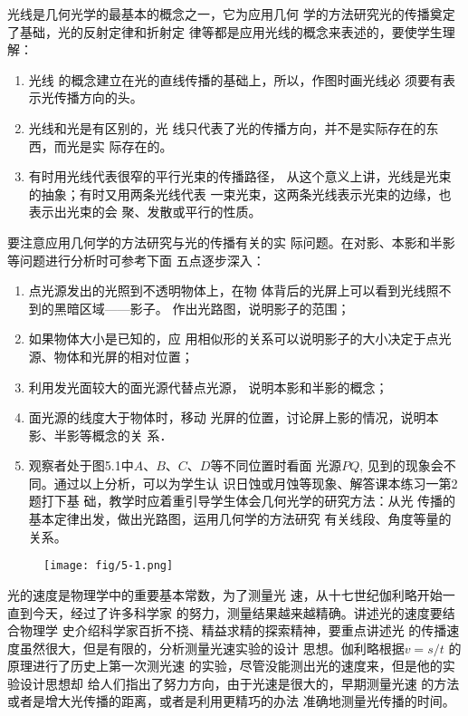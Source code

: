 光线是几何光学的最基本的概念之一，它为应用几何
学的方法研究光的传播奠定了基础，光的反射定律和折射定
律等都是应用光线的概念来表述的，要使学生理解：
\begin{enumerate}
\item 光线
的概念建立在光的直线传播的基础上，所以，作图时画光线必
须要有表示光传播方向的头。    
\item 光线和光是有区别的，光
线只代表了光的传播方向，并不是实际存在的东西，而光是实
际存在的。    
\item 有时用光线代表很窄的平行光束的传播路径，
从这个意义上讲，光线是光束的抽象；有时又用两条光线代表
一束光束，这两条光线表示光束的边缘，也表示出光束的会
聚、发散或平行的性质。
\end{enumerate}

要注意应用几何学的方法研究与光的传播有关的实
际问题。在对影、本影和半影等问题进行分析时可参考下面
五点逐步深入：
\begin{enumerate}

\item 点光源发出的光照到不透明物体上，在物
体背后的光屏上可以看到光线照不到的黑暗区域——影子。
作出光路图，说明影子的范围；
\item 如果物体大小是已知的，应
用相似形的关系可以说明影子的大小决定于点光源、物体和光屏的相对位置；\item 利用发光面较大的面光源代替点光源，
说明本影和半影的概念；
\item 面光源的线度大于物体时，移动
光屏的位置，讨论屏上影的情况，说明本影、半影等概念的关
系．
\item 观察者处于图5.1中$A$、$B$、$C$、$D$等不同位置时看面
光源$PQ$, 见到的现象会不同。通过以上分析，可以为学生认
识日蚀或月蚀等现象、解答课本练习一第2题打下基
础，教学时应着重引导学生体会几何光学的研究方法：从光
传播的基本定律出发，做出光路图，运用几何学的方法研究
有关线段、角度等量的关系。
\end{enumerate}

\begin{figure}[htp]
    \centering
    \texttt{[image: fig/5-1.png]}
    \caption{}
\end{figure}

光的速度是物理学中的重要基本常数，为了测量光
速，从十七世纪伽利略开始一直到今天，经过了许多科学家
的努力，测量结果越来越精确。讲述光的速度要结合物理学
史介绍科学家百折不挠、精益求精的探索精神，要重点讲述光
的传播速度虽然很大，但是有限的，分析测量光速实验的设计
思想。伽利略根据$v=s/t$
的原理进行了历史上第一次测光速
的实验，尽管没能测出光的速度来，但是他的实验设计思想却
给人们指出了努力方向，由于光速是很大的，早期测量光速
的方法或者是增大光传播的距离，或者是利用更精巧的办法
准确地测量光传播的时间。

